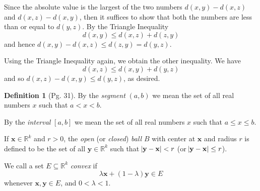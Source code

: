 \documentclass[leqno]{article}
\makeatletter
\theoremstyle{definition}
\newtheorem{definition}{Definition}[section]
\theoremstyle{remark}
\let\oldproofname=\proofname
\renewcommand{\proofname}{\bf{\textit{\oldproofname}}}
\renewenvironment{proof}[1][\proofname]{\par
  \pushQED{\qed}%
  \normalfont \topsep6\p@\@plus6\p@\relax
  \list{}{\leftmargin=0mm
          \rightmargin=0mm
          \settowidth{\itemindent}{\itshape#1}%
          \labelwidth=4mm
          \parsep=0pt \listparindent=0mm%
  }
  \item[\hskip\labelsep
        \itshape
    #1\@addpunct{.}]\ignorespaces
}{%
  \popQED\endlist\@endpefalse
}
\makeatother
\begin{document}
                \begin{proof}
                    Since the absolute value is the largest of the two numbers $d(x,y)-d(x,z)$ and $d(x,z)-d(x,y)$, then it suffices to show that both the numbers are less than or equal to $d(y,z)$. By the Triangle Inequality
                        \begin{equation*}
                            d(x,y)\leq d(x,z)+d(z,y)
                        \end{equation*}
                    and hence $d(x,y)-d(x,z)\leq d(z,y)=d(y,z)$.\par Using the Triangle Inequality again, we obtain the other inequality. We have
                        \begin{equation*}
                            d(x,z)\leq d(x,y)+d(y,z)
                        \end{equation*}
                    and so $d(x,z)-d(x,y)\leq d(y,z)$, as desired.
                \end{proof}
            \begin{definition}[Pg. 31]\label{def:5.4}
                By the \emph{segment} $(a,b)$ we mean the set of all real numbers $x$ such that $a<x<b$.\par By the \emph{interval} $[a,b]$ we mean the set of all real numbers $x$ such that $a\leq x\leq b$.\par If $\mathbf{x}\in\mathbb{R}^k$ and $r>0$, the \emph{open} (or \emph{closed}) \emph{ball} $B$ with center at $\mathbf{x}$ and radius $r$ is defined to be the set of all $\mathbf{y}\in\mathbb{R}^k$ such that $\abs{\mathbf{y}-\mathbf{x}}<r$ (or $\abs{\mathbf{y}-\mathbf{x}}\leq r$).\par We call a set $E\subseteq\mathbb{R}^k$ \emph{convex} if
                    \begin{equation*}
                        \lambda\mathbf{x}+(1-\lambda)\mathbf{y}\in E
                    \end{equation*}
                whenever $\mathbf{x},\mathbf{y}\in E$, and $0<\lambda<1$. \cite{rud}
            \end{definition}
\end{document}
